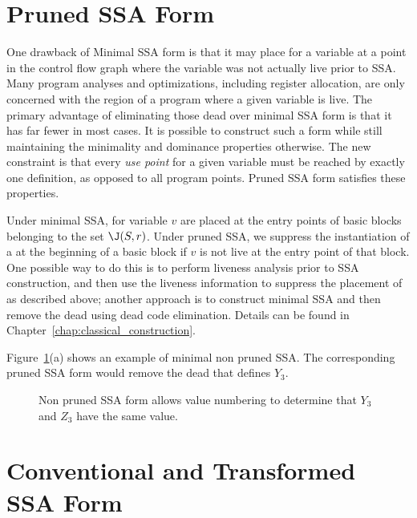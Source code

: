 \section{Pruned SSA Form}
\label{sec-prop-pruned}

One drawback of Minimal SSA form is that it may place \phifuns
for a variable at a point in the control flow graph where the variable was
not actually live prior to SSA. Many program analyses and optimizations,
including register allocation, are only concerned with the region of a 
program where a given variable is live. 
The primary advantage of eliminating those dead \phifuns over minimal SSA form
is that it has far fewer \phifuns in most cases.  
It is possible to construct such a form while still maintaining the minimality
and dominance properties otherwise. The new constraint is that every
\emph{use point} for a given variable must be reached by exactly one
definition, as opposed to all program points. Pruned SSA form satisfies these properties. 

Under minimal SSA, \phifuns for variable $v$ are placed at
the entry points of basic blocks belonging to the set $\J(S,r)$. 
Under pruned SSA, we suppress the instantiation of a \phifun
at the beginning of a basic block if $v$ is not live
at the entry point of that block. One possible way to do this is to
perform liveness analysis prior to SSA construction, and then
use the liveness information to suppress the placement of \phifuns
as described above; another approach is to construct minimal SSA
and then remove the dead \phifuns using dead code
elimination. Details can be found in Chapter~\ref{chap:classical_construction}.

Figure~\ref{fig:properties_and_flavors:pruned}(a) shows an example of minimal non pruned SSA.
The corresponding pruned SSA form would remove the dead \phifun that defines $Y_3$.

\begin{figure}
\caption{Non pruned SSA form allows value numbering to determine that $Y_3$ and $Z_3$ have the same value.}
\label{fig:properties_and_flavors:pruned}
\end{figure}




\section{Conventional and Transformed SSA Form}
\label{sec-prop-conventional}

